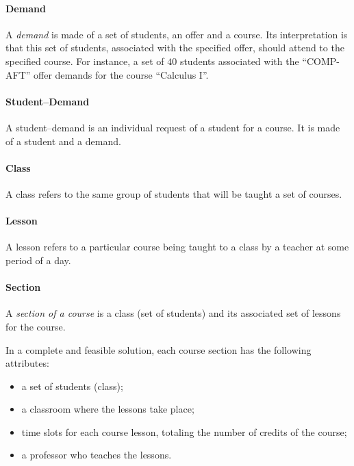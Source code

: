 \paragraph{Demand}
 \label{defdem}

A \textit{demand} is made of a set of students, an offer and a course. Its interpretation is that this set of students, associated with the specified offer, should attend to the specified course.
For instance, a set of $40$ students associated with the ``COMP-AFT'' offer demands for the course ``Calculus I''.


\paragraph{Student--Demand}
\label{defstdem}

A student--demand is an individual request of a student for a course. It is made of a student and a demand.


\paragraph{Class}
\label{defclass}

A class refers to the same group of students that will be taught a set of courses.


\paragraph{Lesson}
\label{deflesson}

A lesson refers to a particular course being taught to a class by a teacher at some period of a day.


\paragraph{Section}
\label{defsection}

A \textit{section of a course} is a class (set of students) and its associated set of lessons for the course.

In a complete and feasible solution, each course section has the following attributes:
\begin{itemize}
\item a set of students (class);
\item a classroom where the lessons take place;
\item time slots for each course lesson, totaling the number of credits of the course;
\item a professor who teaches the lessons.
\end{itemize}


